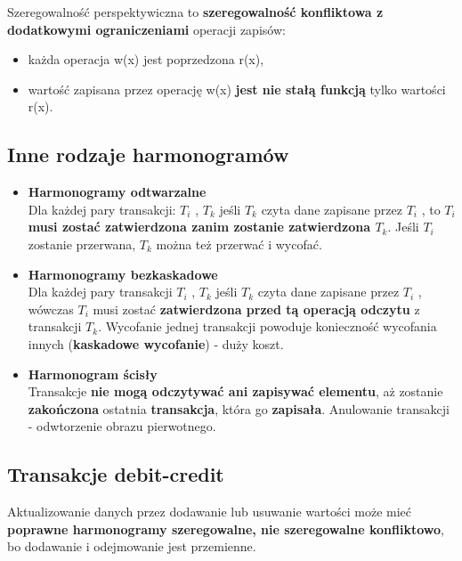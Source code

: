 \documentclass[a4paper]{article}
\begin{document}
Szeregowalność perspektywiczna to \textbf{szeregowalność konfliktowa z dodatkowymi ograniczeniami} operacji zapisów: 
\begin{itemize}
    \item każda operacja w(x) jest poprzedzona r(x),
    \item wartość zapisana przez operację w(x) \textbf{jest nie stałą funkcją} tylko wartości r(x).
\end{itemize}

\subsection{Inne rodzaje harmonogramów}
\begin{itemize}
    \item \textbf{Harmonogramy odtwarzalne}\\
    Dla każdej pary transakcji: $T_i$ , $T_k$ jeśli $T_k$ czyta dane zapisane przez $T_i$ , to \textbf{$T_i$ musi zostać zatwierdzona zanim zostanie zatwierdzona $T_k$}. Jeśli $T_i$ zostanie przerwana, $T_k$ można też przerwać i wycofać.\\
    
    \item \textbf{Harmonogramy bezkaskadowe}\\
    Dla każdej pary transakcji $T_i$ , $T_k$ jeśli $T_k$ czyta dane zapisane przez $T_i$ , wówczas $T_i$ musi zostać \textbf{zatwierdzona przed tą operacją odczytu} z transakcji $T_k$. Wycofanie jednej transakcji powoduje konieczność wycofania innych (\textbf{kaskadowe wycofanie}) - duży koszt.\\
    
    \item \textbf{Harmonogram ścisły}\\
    Transakcje \textbf{nie mogą odczytywać ani zapisywać elementu}, aż zostanie \textbf{zakończona} ostatnia \textbf{transakcja}, która go \textbf{zapisała}. Anulowanie transakcji - odwtorzenie obrazu pierwotnego.
\end{itemize}

\subsection{Transakcje debit-credit}
Aktualizowanie danych przez dodawanie lub usuwanie wartości może mieć \textbf{poprawne harmonogramy szeregowalne, nie szeregowalne konfliktowo}, bo dodawanie i odejmowanie jest przemienne.
\end{document}
